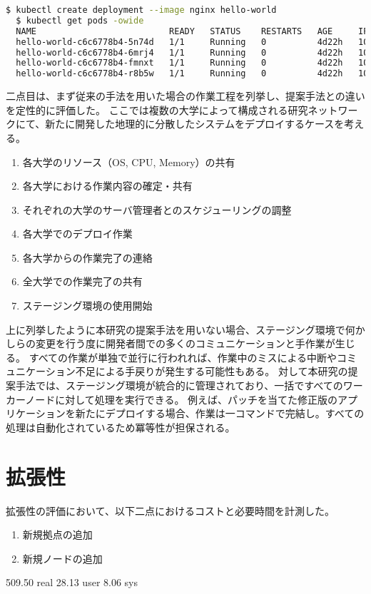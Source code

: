 \begin{lstlisting}[language=bash]
  $ kubectl create deployment --image nginx hello-world
  $ kubectl get pods -owide
  NAME                          READY   STATUS    RESTARTS   AGE     IP          NODE       NOMINATED NODE   READINESS GATES
  hello-world-c6c6778b4-5n74d   1/1     Running   0          4d22h   10.44.0.1   node01     <none>           <none>
  hello-world-c6c6778b4-6mrj4   1/1     Running   0          4d22h   10.42.0.1   node03     <none>           <none>
  hello-world-c6c6778b4-fmnxt   1/1     Running   0          4d22h   10.47.0.1   node02     <none>           <none>
  hello-world-c6c6778b4-r8b5w   1/1     Running   0          4d22h   10.44.0.2   node04   <none>           <none>
\end{lstlisting}

二点目は、まず従来の手法を用いた場合の作業工程を列挙し、提案手法との違いを定性的に評価した。
ここでは複数の大学によって構成される研究ネットワークにて、新たに開発した地理的に分散したシステムをデプロイするケースを考える。

\begin{enumerate}
  \item 各大学のリソース（OS, CPU, Memory）の共有
  \item 各大学における作業内容の確定・共有
  \item それぞれの大学のサーバ管理者とのスケジューリングの調整
  \item 各大学でのデプロイ作業
  \item 各大学からの作業完了の連絡
  \item 全大学での作業完了の共有
  \item ステージング環境の使用開始
\end{enumerate}

上に列挙したように本研究の提案手法を用いない場合、ステージング環境で何かしらの変更を行う度に開発者間での多くのコミュニケーションと手作業が生じる。
すべての作業が単独で並行に行われれば、作業中のミスによる中断やコミュニケーション不足による手戻りが発生する可能性もある。
対して本研究の提案手法では、ステージング環境が統合的に管理されており、一括ですべてのワーカーノードに対して処理を実行できる。
例えば、パッチを当てた修正版のアプリケーションを新たにデプロイする場合、作業は一コマンドで完結し。すべての処理は自動化されているため冪等性が担保される。

\section{拡張性}
\label{evaluation:method}

拡張性の評価において、以下二点におけるコストと必要時間を計測した。

\begin{enumerate}
  \item 新規拠点の追加
  \item 新規ノードの追加
\end{enumerate}

509.50 real        28.13 user         8.06 sys

